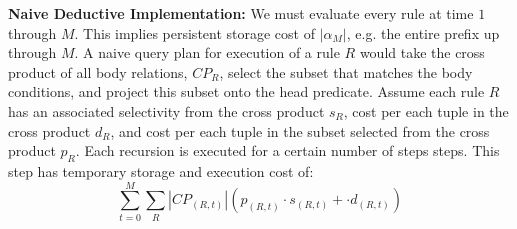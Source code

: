 %
%
{\bf Naive Deductive Implementation: } We must evaluate every rule at time $1$
through $M$.  This implies persistent storage cost of $|\alpha_M|$, e.g. the
entire prefix up through $M$.
A naive query plan for execution of a rule $R$ would take the cross product of
all body relations, $CP_R$, select the subset that matches the body conditions,
and project this subset onto the head predicate.  Assume each rule $R$ has an
associated selectivity from the cross product $s_R$, cost per each tuple in the
cross product $d_R$, and cost per each tuple in the subset selected from the
cross product $p_R$.  Each recursion is executed for a certain number of steps
steps.  This step has temporary storage and execution cost of:
%
\[ \sum_{t=0}^M \sum_{R} |CP_{(R,t)}|(p_{(R,t)} \cdot s_{(R,t)} + \cdot
d_{(R,t)}) \]
%







%

